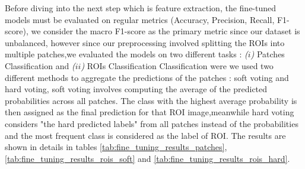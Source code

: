\documentclass[
11pt, %
english, %
singlespacing, %
headsepline, %
]{project_structure}
\begin{document}
\noindent Before diving into the next step which is feature extraction, the fine-tuned models must be evaluated on regular metrics (Accuracy, Precision, Recall, F1-score), we consider the macro F1-score as the primary metric since our dataset is unbalanced, however since our preprocessing involved splitting the \acrshort{ROI}s into multiple patches,we evaluated the models on two different tasks : \textit{($i$)} Patches Classification and \textit{($ii$)} ROIs Classification Classification were we used two different methods to aggregate the predictions of the patches : soft voting and hard voting, soft voting involves computing the average of the predicted probabilities across all patches. The class with the highest average probability is then assigned as the final prediction for that \acrshort{ROI} image,meanwhile hard voting considers "the hard predicted labels" from all patches instead of the probabilities and the most frequent class is considered as the label of \acrshort{ROI}. The results are shown in details in tables \ref{tab:fine_tuning_results_patches},\ref{tab:fine_tuning_results_rois_soft} and \ref{tab:fine_tuning_results_rois_hard}.\\

\end{document}
